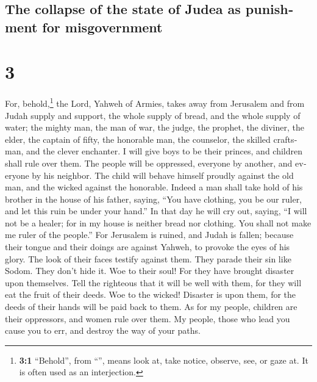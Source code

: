 \begin{paracol}{2}
\switchcolumn
\begin{otherlanguage}{english}

\hypertarget{the-collapse-of-the-state-of-judea-as-punishment-for-misgovernment}{%
\subsection{The collapse of the state of Judea as punishment for
misgovernment}\label{the-collapse-of-the-state-of-judea-as-punishment-for-misgovernment}}

\hypertarget{section-5}{%
\section{3}\label{section-5}}

 For, behold,\footnote{\textbf{3:1} ``Behold'', from
  ``'', means look at, take notice, observe, see, or gaze
  at. It is often used as an interjection.} the Lord, Yahweh of Armies,
takes away from Jerusalem and from Judah supply and support, the whole
supply of bread, and the whole supply of water;  the
mighty man, the man of war, the judge, the prophet, the diviner, the
elder,  the captain of fifty, the honorable man, the
counselor, the skilled craftsman, and the clever enchanter.
 I will give boys to be their princes, and children shall
rule over them.  The people will be oppressed, everyone by
another, and everyone by his neighbor. The child will behave himself
proudly against the old man, and the wicked against the honorable.
 Indeed a man shall take hold of his brother in the house
of his father, saying, ``You have clothing, you be our ruler, and let
this ruin be under your hand.''  In that day he will cry
out, saying, ``I will not be a healer; for in my house is neither bread
nor clothing. You shall not make me ruler of the people.''
 For Jerusalem is ruined, and Judah is fallen; because
their tongue and their doings are against Yahweh, to provoke the eyes of
his glory.  The look of their faces testify against them.
They parade their sin like Sodom. They don't hide it. Woe to their soul!
For they have brought disaster upon themselves.  Tell the
righteous that it will be well with them, for they will eat the fruit of
their deeds.  Woe to the wicked! Disaster is upon them,
for the deeds of their hands will be paid back to them. 
As for my people, children are their oppressors, and women rule over
them. My people, those who lead you cause you to err, and destroy the
way of your paths.


\end{otherlanguage}
\end{paracol}
